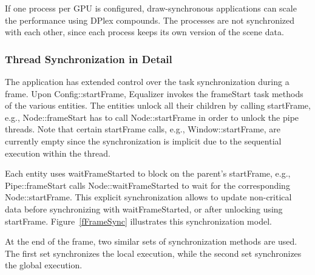 \documentclass[10pt,a4]{scrartcl}
\newcommand{\fig}[1]{Figure~\ref{#1}}
\begin{document}
If one process per GPU is configured, draw-synchronous applications can
scale the performance using DPlex compounds. The processes are not
synchronized with each other, since each process keeps its own version
of the scene data.


\subsubsection{Thread Synchronization in Detail}

The application has extended control over the task synchronization
during a frame. Upon \textsf{Config::startFrame}, Equalizer invokes the
\textsf{frameStart} task methods of the various entities. The entities
unlock all their children by calling \textsf{startFrame}, e.g.,
\textsf{Node::frameStart} has to call \textsf{Node::startFrame} in order
to unlock the pipe threads. Note that certain \textsf{startFrame} calls,
e.g., \textsf{Window::startFrame}, are currently empty since the
synchronization is implicit due to the sequential execution within the
thread.

Each entity uses \textsf{waitFrame\-Started} to block on the parent's
\textsf{startFrame}, e.g., \textsf{Pipe::\-frame\-Start} calls
\textsf{Node::wait\-Frame\-Started} to wait for the corresponding
\textsf{Node::start\-Fra\-me}. This explicit synchronization allows to
update non-critical data before synchronizing with
\textsf{waitFrameStarted}, or after unlocking using
\textsf{start\-Fra\-me}. \fig{fFrameSync} illustrates this
synchronization model.

At the end of the frame, two similar sets of synchronization methods are
used. The first set synchronizes the local execution, while the second
set synchronizes the global execution.
\end{document}
